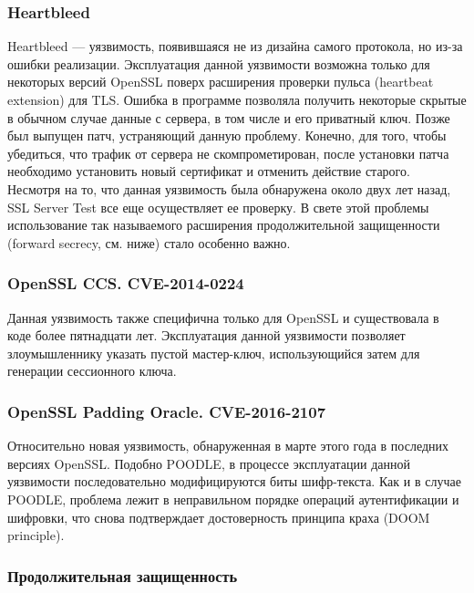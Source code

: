 \subsubsection{Heartbleed}

Heartbleed --- уязвимость, появившаяся не из дизайна самого протокола, но из-за ошибки реализации. Эксплуатация данной уязвимости
возможна только для некоторых версий OpenSSL поверх расширения проверки пульса (heartbeat extension) для TLS. Ошибка в программе 
позволяла получить некоторые скрытые в обычном случае данные с сервера, в том числе и его приватный ключ. Позже был выпущен патч,
устраняющий данную проблему. Конечно, для того, чтобы убедиться, что трафик от сервера не скомпрометирован, после установки
патча необходимо установить новый сертификат и отменить действие старого. Несмотря на то, что данная уязвимость была обнаружена
около двух лет назад, SSL Server Test все еще осуществляет ее проверку. В свете этой проблемы использование так называемого 
расширения продолжительной защищенности (forward secrecy, см. ниже) стало особенно важно.

\subsubsection{OpenSSL CCS. CVE-2014-0224}

Данная уязвимость также специфична только для OpenSSL и существовала в коде более пятнадцати лет. Эксплуатация данной уязвимости 
позволяет злоумышленнику указать пустой мастер-ключ, использующийся затем для генерации сессионного ключа.

\subsubsection{OpenSSL Padding Oracle. CVE-2016-2107} \label{sssct:OpenSSLPO}

Относительно новая уязвимость, обнаруженная в марте этого года в последних версиях OpenSSL. Подобно POODLE, в процессе эксплуатации
данной уязвимости последовательно модифицируются биты шифр-текста. Как и в случае POODLE, проблема лежит в неправильном порядке 
операций аутентификации и шифровки, что снова подтверждает достоверность принципа краха (DOOM principle). 

\subsubsection{Продолжительная защищенность}

